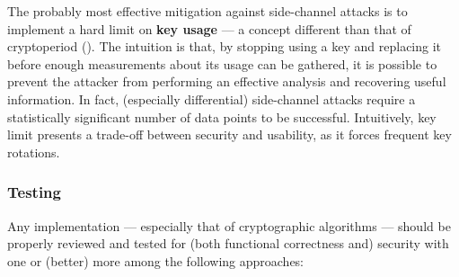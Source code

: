 The probably most effective mitigation against side-channel attacks is to implement a hard limit on \textbf{key usage} --- a concept different than that of cryptoperiod (). The intuition is that, by stopping using a key and replacing it before enough measurements about its usage can be gathered, it is possible to prevent the attacker from performing an effective analysis and recovering useful information. In fact, (especially differential) side-channel attacks require a statistically significant number of data points to be successful. Intuitively, key limit presents a trade-off between security and usability, as it forces frequent key rotations.

\subsubsection{Testing}\label{sec:security_of_cryptographic_algorithms:best_practices:test}

Any implementation --- especially that of cryptographic algorithms --- should be properly reviewed and tested for (both functional correctness and) security with one or (better) more among the following approaches:


